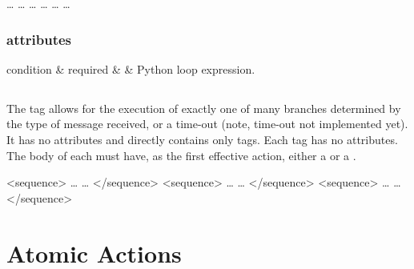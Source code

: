 \begin{codelisting}
        \dots
        \dots
        \dots
        \dots
        \dots
        \dots
\end{codelisting}

\subsubsection{ attributes}

\begin{attrDefs}
condition	&	required	&			& Python loop expression. \\
\end{attrDefs}

\subsection{}

The  tag allows for the execution of exactly one
of many branches determined by the type of message received,
or a time-out (note, time-out not implemented yet).  It has
no attributes and directly contains only  tags.
Each  tag has no attributes.  The body of each
 must have, as the first effective action, 
either a  or a .

\begin{codelisting}
        <sequence>
            \dots
            \dots
        </sequence>
        <sequence>
            \dots
            \dots
        </sequence>
        <sequence>
            \dots
            \dots
        </sequence>
\end{codelisting}



\section{Atomic Actions}

